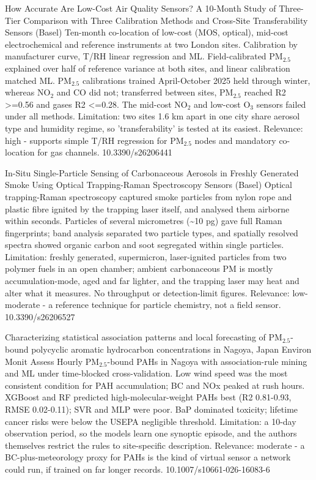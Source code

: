 \documentclass[10pt]{article}
\begin{document}
{How Accurate Are Low-Cost Air Quality Sensors? A 10-Month Study of Three-Tier Comparison with Three Calibration Methods and Cross-Site Transferability}
{Sensors (Basel)}
{Ten-month co-location of low-cost (MOS, optical), mid-cost electrochemical and reference instruments at two London sites. Calibration by manufacturer curve, T/RH linear regression and ML. Field-calibrated PM$_{2.5}$ explained over half of reference variance at both sites, and linear calibration matched ML. PM$_{2.5}$ calibrations trained April-October 2025 held through winter, whereas NO$_2$ and CO did not; transferred between sites, PM$_{2.5}$ reached R2 >=0.56 and gases R2 <=0.28. The mid-cost NO$_2$ and low-cost O$_3$ sensors failed under all methods. Limitation: two sites 1.6 km apart in one city share aerosol type and humidity regime, so 'transferability' is tested at its easiest. Relevance: high - supports simple T/RH regression for PM$_{2.5}$ nodes and mandatory co-location for gas channels.}
{10.3390/s26206441}

{In-Situ Single-Particle Sensing of Carbonaceous Aerosols in Freshly Generated Smoke Using Optical Trapping-Raman Spectroscopy}
{Sensors (Basel)}
{Optical trapping-Raman spectroscopy captured smoke particles from nylon rope and plastic fibre ignited by the trapping laser itself, and analysed them airborne within seconds. Particles of several micrometres (\textasciitilde{}10 pg) gave full Raman fingerprints; band analysis separated two particle types, and spatially resolved spectra showed organic carbon and soot segregated within single particles. Limitation: freshly generated, supermicron, laser-ignited particles from two polymer fuels in an open chamber; ambient carbonaceous PM is mostly accumulation-mode, aged and far lighter, and the trapping laser may heat and alter what it measures. No throughput or detection-limit figures. Relevance: low-moderate - a reference technique for particle chemistry, not a field sensor.}
{10.3390/s26206527}

{Characterizing statistical association patterns and local forecasting of PM$_{2.5}$-bound polycyclic aromatic hydrocarbon concentrations in Nagoya, Japan}
{Environ Monit Assess}
{Hourly PM$_{2.5}$-bound PAHs in Nagoya with association-rule mining and ML under time-blocked cross-validation. Low wind speed was the most consistent condition for PAH accumulation; BC and NOx peaked at rush hours. XGBoost and RF predicted high-molecular-weight PAHs best (R2 0.81-0.93, RMSE 0.02-0.11); SVR and MLP were poor. BaP dominated toxicity; lifetime cancer risks were below the USEPA negligible threshold. Limitation: a 10-day observation period, so the models learn one synoptic episode, and the authors themselves restrict the rules to site-specific description. Relevance: moderate - a BC-plus-meteorology proxy for PAHs is the kind of virtual sensor a network could run, if trained on far longer records.}
{10.1007/s10661-026-16083-6}
\end{document}
